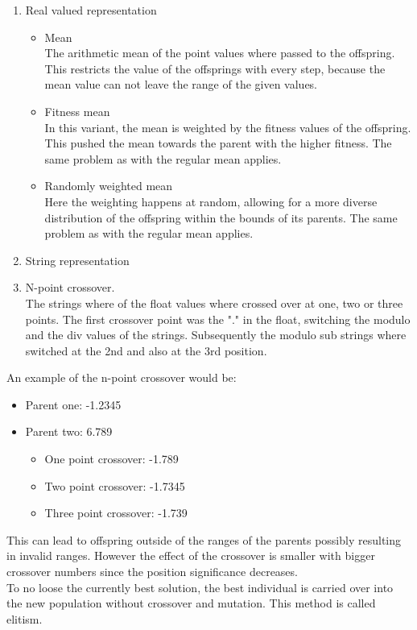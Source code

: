 \documentclass{scrartcl}
\begin{document}
\begin{enumerate}
\item Real valued representation
	\begin{itemize}
	\item Mean\\
	The arithmetic mean of the point values where passed to the offspring. This restricts the value of the offsprings with every step, because the mean value can not leave the range of the given values.
	\item Fitness mean\\
	In this variant, the mean is weighted by the fitness values of the offspring. This pushed the mean towards the parent with the higher fitness. The same problem as with the regular mean applies. 
	\item Randomly weighted mean\\
	Here the weighting happens at random, allowing for a more diverse distribution of the offspring within the bounds of its parents. The same problem as with the regular mean applies. 
	\end{itemize}
\item String representation
	\item N-point crossover.\\
	The strings where of the float values where crossed over at one, two or three points. The first crossover point was the "." in the float, switching the modulo and the div values of the strings. Subsequently the modulo sub strings where switched at the 2nd and also at the 3rd position.
\end{enumerate}

An example of the n-point crossover would be:

\begin{itemize}
\item Parent one: -1.2345
\item Parent two: 6.789
\begin{itemize}
	\item One point crossover: -1.789
	\item Two point crossover: -1.7345
	\item Three point crossover: -1.739
	\end{itemize}
\end{itemize}
 
This can lead to offspring outside of the ranges of the parents possibly resulting in invalid ranges. However the effect of the crossover is smaller with bigger crossover numbers since the position significance decreases.\\
To no loose the currently best solution, the best individual is carried over into the new population without crossover and mutation. This method is called elitism.
\end{document}
